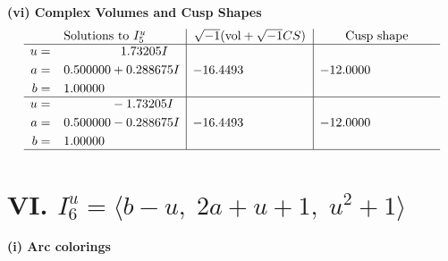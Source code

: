 \documentclass[1p]{elsarticle_modified}
\theoremstyle{definition}
\newcommand{\I}{\sqrt{-1}}
\begin{document}
\newpage\flushleft \textbf{(vi) Complex Volumes and Cusp Shapes}
$$\begin{array}{c|c|c}  
\text{Solutions to }I^u_{5}& \I (\text{vol} + \sqrt{-1}CS) & \text{Cusp shape}\\
 \hline 
\begin{aligned}
u &= \phantom{-0.000000 -}1.73205 I \\
a &= \phantom{-}0.500000 + 0.288675 I \\
b &= \phantom{-}1.00000\phantom{ +0.000000I}\end{aligned}
 & -16.4493\phantom{ +0.000000I} & -12.0000\phantom{ +0.000000I} \\ \hline\begin{aligned}
u &= \phantom{-0.000000 } -1.73205 I \\
a &= \phantom{-}0.500000 - 0.288675 I \\
b &= \phantom{-}1.00000\phantom{ +0.000000I}\end{aligned}
 & -16.4493\phantom{ +0.000000I} & -12.0000\phantom{ +0.000000I}\\
 \hline 
 \end{array}$$\newpage\newpage\renewcommand{\arraystretch}{1}
\centering \section*{VI. $I^u_{6}= \langle b- u,\;2 a+u+1,\;u^2+1 \rangle$}
\flushleft \textbf{(i) Arc colorings}\\
\end{document}
